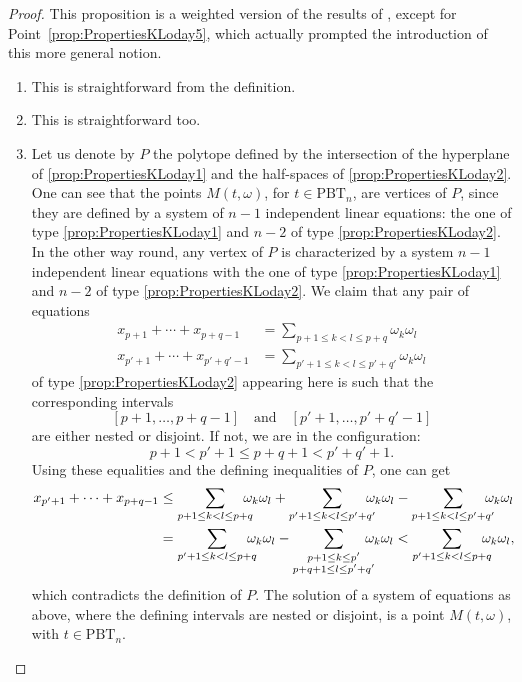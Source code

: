 \documentclass[JEP,XML,SOM,Unicode,NoFloatCountersInSection]{cedram}
\theoremstyle{plain}
\theoremstyle{definition}
\newcommand{\Tam}[1]{\mathrm{PBT}_{#1}}
\begin{document}
\begin{proof}
This proposition is a weighted version of the results of \cite{Loday04a}, except for Point~\eqref{prop:PropertiesKLoday5}, which actually prompted the introduction of this more general notion.
\leavevmode
\begin{enumerate}
\item This is straightforward from the definition.
\item This is straightforward too.
\item Let us denote by $P$ the polytope defined by the intersection of the hyperplane of \eqref{prop:PropertiesKLoday1} and the half-spaces of \eqref{prop:PropertiesKLoday2}.
One can see that the points $M(t, \omega)$, for $t\in \Tam{n}$, are vertices of $P$, since they are defined by a system of $n-1$ independent linear equations: the one of type \eqref{prop:PropertiesKLoday1} and $n-2$ of type \eqref{prop:PropertiesKLoday2}.
In the other way round, any vertex of $P$ is characterized by a system $n-1$ independent linear equations with the one of type \eqref{prop:PropertiesKLoday1} and $n-2$ of type \eqref{prop:PropertiesKLoday2}. We claim that any pair of equations
\begin{align*}
x_{p+1}+\cdots+x_{p+q-1}&= \sum_{p+1\leq k<l\leq p+q} \omega_k \omega_l\\
\tag*{and}
x_{p'+1}+\cdots+x_{p'+q'-1}&= \sum_{p'+1\leq k<l\leq p'+q'} \omega_k \omega_l
\end{align*}
of type \eqref{prop:PropertiesKLoday2} appearing here is such that the corresponding intervals
\[
[p+1, \ldots, p+q-1]\quad\text{and}\quad [p'+1, \ldots, p'+q'-1]
\]
are either nested or disjoint.
If not, we are in the configuration:
\[
p+1<p'+1\leq p+q+1<p'+q'+1.
\]
Using these equalities and the defining inequalities of $P$, one can get
\begin{align*}
x_{p'+1}+\cdots+x_{p+q-1}&\leq
\sum_{p+1\leq k<l\leq p+q}\hspace*{-3mm} \omega_k \omega_l
+\sum_{p'+1\leq k<l\leq p'+q'}\hspace*{-3mm} \omega_k \omega_l
-\sum_{p+1\leq k<l\leq p'+q'}\hspace*{-3mm} \omega_k \omega_l \\
&=
\sum_{p'+1\leq k<l\leq p+q}\hspace*{-3mm} \omega_k \omega_l
-
\sum_{\substack{p+1\leq k\leq p'\\ p+q+1\leq l\leq p'+q'}}\hspace*{-3mm} \omega_k \omega_l
< \sum_{p'+1\leq k<l\leq p+q}\hspace*{-3mm} \omega_k \omega_l,
\end{align*}
which contradicts the definition of $P$.
The solution of a system of equations as above, where the defining intervals are nested or disjoint, is a point
$M(t,\omega)$, with
$t\in \Tam{n}$.


\end{enumerate}
\end{proof}
\end{document}
